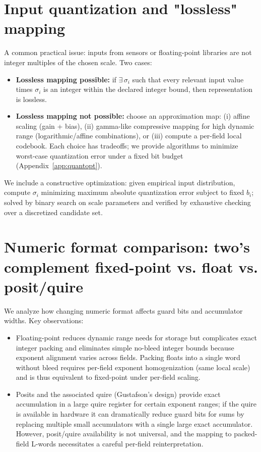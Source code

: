 \documentclass[11pt]{article}
\theoremstyle{definition}
\theoremstyle{plain}
\begin{document}
\section{Input quantization and "lossless" mapping}
A common practical issue: inputs from sensors or floating-point libraries are not integer multiples of the chosen scale.  Two cases:
\begin{itemize}
  \item \textbf{Lossless mapping possible:} if $\exists\,\sigma_i$ such that every relevant input value times $\sigma_i$ is an integer within the declared integer bound, then representation is lossless.
  \item \textbf{Lossless mapping not possible:} choose an approximation map: (i) affine scaling (gain + bias), (ii) gamma-like compressive mapping for high dynamic range (logarithmic/affine combinations), or (iii) compute a per-field local codebook. Each choice has tradeoffs; we provide algorithms to minimize worst-case quantization error under a fixed bit budget (Appendix~\ref{app:quantopt}).
\end{itemize}

We include a constructive optimization: given empirical input distribution, compute $\sigma_i$ minimizing maximum absolute quantization error subject to fixed $b_i$; solved by binary search on scale parameters and verified by exhaustive checking over a discretized candidate set.

\section{Numeric format comparison: two's complement fixed-point vs. float vs. posit/quire}
We analyze how changing numeric format affects guard bits and accumulator widths.  Key observations:
\begin{itemize}
  \item Floating-point reduces dynamic range needs for storage but complicates exact integer packing and eliminates simple no-bleed integer bounds because exponent alignment varies across fields. Packing floats into a single word without bleed requires per-field exponent homogenization (same local scale) and is thus equivalent to fixed-point under per-field scaling.
  \item Posits and the associated quire (Gustafson's design) provide exact accumulation in a large quire register for certain exponent ranges; if the quire is available in hardware it can dramatically reduce guard bits for sums by replacing multiple small accumulators with a single large exact accumulator.  However, posit/quire availability is not universal, and the mapping to packed-field L-words necessitates a careful per-field reinterpretation.
\end{itemize}
\end{document}
